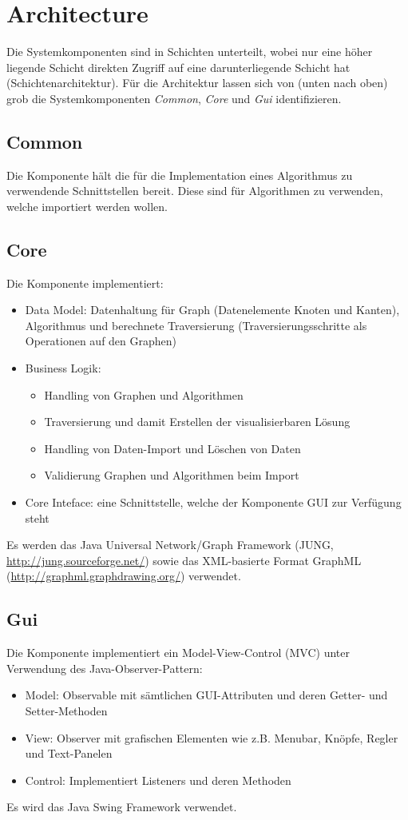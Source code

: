 \section{Architecture}
\label{sec:Architecture}
Die Systemkomponenten sind in Schichten unterteilt, wobei nur eine h\"oher liegende Schicht direkten Zugriff auf eine darunterliegende Schicht hat (Schichtenarchitektur). F\"ur die Architektur lassen sich von (unten nach oben) grob die Systemkomponenten \textit{Common}, \textit{Core} und \textit{Gui} identifizieren.

\subsection{Common}
\label{subsec:Common}
Die Komponente h\"alt die f\"ur die Implementation eines Algorithmus zu verwendende Schnittstellen bereit. Diese sind f\"ur Algorithmen zu verwenden, welche importiert werden wollen.

\subsection{Core}
\label{subsec:Core}
Die Komponente implementiert:
\begin{itemize}
  \item Data Model: Datenhaltung f\"ur Graph (Datenelemente Knoten und Kanten), Algorithmus und berechnete Traversierung (Traversierungsschritte als Operationen auf den Graphen)
  \item Business Logik: 
  \begin{itemize}
      \item Handling von Graphen und Algorithmen
      \item Traversierung und damit Erstellen der visualisierbaren L\"osung
      \item Handling von Daten-Import und L\"oschen von Daten
      \item Validierung Graphen und Algorithmen beim Import
  \end{itemize}
  \item Core Inteface: eine Schnittstelle, welche der Komponente GUI zur Verf\"ugung steht
\end{itemize}
Es werden das Java Universal Network/Graph Framework (JUNG, \url{http://jung.sourceforge.net/}) sowie das XML-basierte Format GraphML (\url{http://graphml.graphdrawing.org/}) verwendet.

\subsection{Gui}
\label{subsec:Gui}
Die Komponente implementiert ein Model-View-Control (MVC) unter Verwendung des Java-Observer-Pattern:
\begin{itemize}
  \item Model: Observable mit s\"amtlichen GUI-Attributen und deren Getter- und Setter-Methoden
  \item View: Observer mit grafischen Elementen wie z.B. Menubar, Kn\"opfe, Regler und Text-Panelen
  \item Control: Implementiert Listeners und deren Methoden
\end{itemize}
Es wird das Java Swing Framework verwendet.
% 
